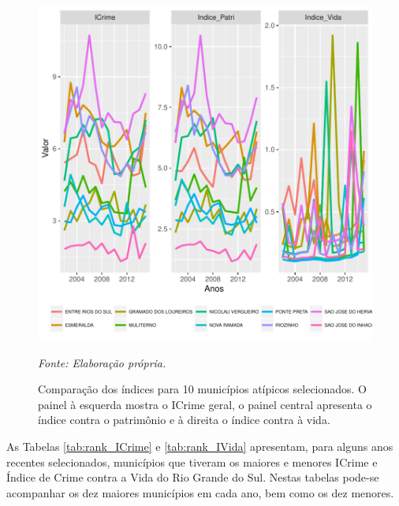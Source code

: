\documentclass[12pt,openright,oneside,a4paper,english,french,spanish]{abntex2}
\numberwithin{table}{section} %
\numberwithin{figure}{section} %
\newcommand{\source}[1]{\textit{#1}}
\begin{document}
\begin{figure}
\begin{center}
\includegraphics{TESE_DE_DOUTORADO_RENAN_FINAL-plot11}
\end{center}
\caption{Comparação dos índices para 10 municípios atípicos selecionados. O painel à esquerda mostra o ICrime geral, o painel central apresenta o índice contra o patrimônio e à direita o índice contra à vida.}
\source{Fonte: Elaboração própria.}
\label{fig:indices_low10}
\end{figure}


As Tabelas \ref{tab:rank_ICrime} e \ref{tab:rank_IVida} apresentam, para alguns anos recentes selecionados, municípios que tiveram os maiores e menores ICrime e Índice de Crime contra a Vida do Rio Grande do Sul. Nestas tabelas pode-se acompanhar os dez maiores municípios em cada ano, bem como os dez menores.
\end{document}
